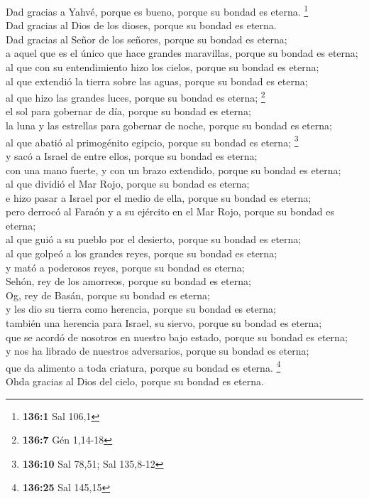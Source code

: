  Dad gracias a Yahvé, porque es bueno, porque su bondad es
eterna. \footnote{\textbf{136:1} Sal 106,1}\\
 Dad gracias al Dios de los dioses, porque su bondad es
eterna.\\
 Dad gracias al Señor de los señores, porque su bondad es
eterna;\\
 a aquel que es el único que hace grandes maravillas,
porque su bondad es eterna;\\
 al que con su entendimiento hizo los cielos, porque su
bondad es eterna;\\
 al que extendió la tierra sobre las aguas, porque su
bondad es eterna;\\
 al que hizo las grandes luces, porque su bondad es
eterna; \footnote{\textbf{136:7} Gén 1,14-18}\\
 el sol para gobernar de día, porque su bondad es
eterna;\\
 la luna y las estrellas para gobernar de noche, porque su
bondad es eterna;\\
 al que abatió al primogénito egipcio, porque su bondad
es eterna; \footnote{\textbf{136:10} Sal 78,51; Sal 135,8-12}\\
 y sacó a Israel de entre ellos, porque su bondad es
eterna;\\
 con una mano fuerte, y con un brazo extendido, porque su
bondad es eterna;\\
 al que dividió el Mar Rojo, porque su bondad es
eterna;\\
 e hizo pasar a Israel por el medio de ella, porque su
bondad es eterna;\\
 pero derrocó al Faraón y a su ejército en el Mar Rojo,
porque su bondad es eterna;\\
 al que guió a su pueblo por el desierto, porque su
bondad es eterna;\\
 al que golpeó a los grandes reyes, porque su bondad es
eterna;\\
 y mató a poderosos reyes, porque su bondad es eterna;\\
 Sehón, rey de los amorreos, porque su bondad es
eterna;\\
 Og, rey de Basán, porque su bondad es eterna;\\
 y les dio su tierra como herencia, porque su bondad es
eterna;\\
 también una herencia para Israel, su siervo, porque su
bondad es eterna;\\
 que se acordó de nosotros en nuestro bajo estado, porque
su bondad es eterna;\\
 y nos ha librado de nuestros adversarios, porque su
bondad es eterna;\\
 que da alimento a toda criatura, porque su bondad es
eterna. \footnote{\textbf{136:25} Sal 145,15}\\
 Ohda gracias al Dios del cielo, porque su bondad es
eterna.

